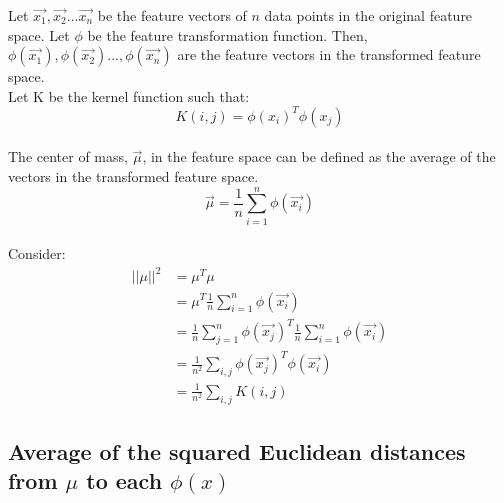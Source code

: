 \documentclass{article}
\begin{document}
Let $\vec{x_{1}}, \vec{x_{2}} ... \vec{x_{n}}$ be the feature vectors of $n$ data points in the original feature space. Let $\phi$ be the feature transformation function. Then, $\phi(\vec{x_{1}}), \phi(\vec{x_{2}}) ..., \phi(\vec{x_{n}})$ are the feature vectors in the transformed feature space.  
\\
Let K be the kernel function such that:
\begin{equation*}
K(i,j) = \phi(x_{i})^T \phi(x_{j})
\end{equation*} 
\\
The center of mass, $\vec{\mu}$, in the feature space can be defined as the average of the vectors in the transformed feature space. 
\begin{equation*}
\vec{\mu} = \frac{1}{n}\sum_{i=1}^{n} \phi(\vec{x_{i}})
\end{equation*}
\\
Consider:
\begin{equation*}
\begin{split}
||{\mu}||^{2} &= \mu^T\mu \\ 
              &= \mu^T \frac{1}{n}\sum_{i=1}^{n} \phi(\vec{x_{i}}) \\
              &= \frac{1}{n}\sum_{j=1}^{n} \phi(\vec{x_{j}})^T \frac{1}{n}\sum_{i=1}^{n} \phi(\vec{x_{i}}) \\
              &= \frac{1}{n^2} \sum_{i,j} \phi(\vec{x_{j}})^{T} \phi(\vec{x_{i}}) \\
              &= \frac{1}{n^2} \sum_{i,j} K(i,j)
\end{split}
\end{equation*}

\subsection*{Average of the squared Euclidean distances from $\mu$ to each $\phi(x)$} 
\end{document}
